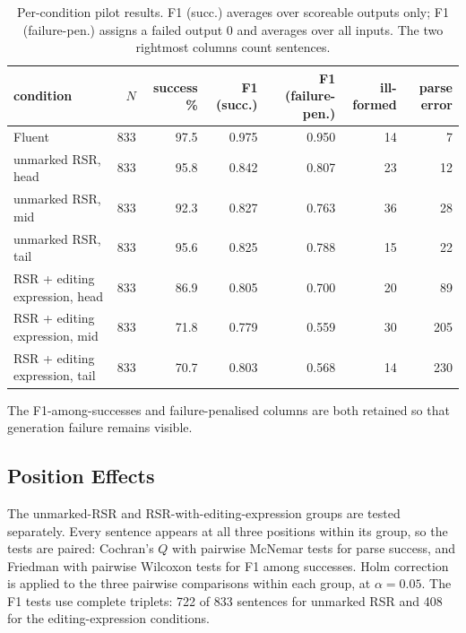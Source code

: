 \documentclass{article}
\begin{document}
\begin{table}[ht]
\centering
\small
\begin{tabular}{lrrrrrr}
\toprule
condition & $N$ & success \% & F1 (succ.) & F1 (failure-pen.) & ill-formed & parse error \\
\midrule
Fluent                     & 833 & 97.5 & 0.975 & 0.950 & 14 &   7 \\
\addlinespace
unmarked RSR, head         & 833 & 95.8 & 0.842 & 0.807 & 23 &  12 \\
unmarked RSR, mid          & 833 & 92.3 & 0.827 & 0.763 & 36 &  28 \\
unmarked RSR, tail         & 833 & 95.6 & 0.825 & 0.788 & 15 &  22 \\
\addlinespace
RSR + editing expression, head & 833 & 86.9 & 0.805 & 0.700 & 20 &  89 \\
RSR + editing expression, mid  & 833 & 71.8 & 0.779 & 0.559 & 30 & 205 \\
RSR + editing expression, tail & 833 & 70.7 & 0.803 & 0.568 & 14 & 230 \\
\bottomrule
\end{tabular}
\caption{Per-condition pilot results. F1 (succ.) averages over scoreable
outputs only; F1 (failure-pen.) assigns a failed output 0 and averages over all
inputs. The two rightmost columns count sentences.}
\label{tab:pilot-full}
\end{table}

The F1-among-successes and failure-penalised columns are both retained so that generation failure remains visible.

\subsection{Position Effects}

The unmarked-RSR and RSR-with-editing-expression groups are tested separately. Every sentence
appears at all three positions within its group, so the tests are paired:
Cochran's $Q$ with pairwise McNemar tests for parse success, and Friedman with
pairwise Wilcoxon tests for F1 among successes. Holm correction is applied to
the three pairwise comparisons within each group, at $\alpha = 0.05$. The F1
tests use complete triplets: 722 of 833 sentences for unmarked RSR and 408 for
the editing-expression conditions.
\end{document}
